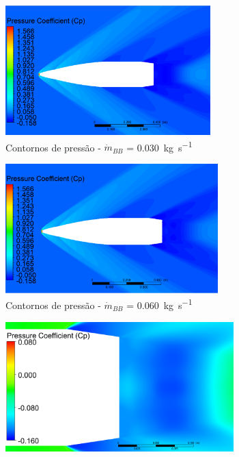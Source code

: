 \begin{figure}[!htpb]
	\centering
	\begin{subfigure}[b]{0.47\textwidth} %
        \centering
        \includegraphics[height=5cm,width=\textwidth]{contorno-pressao-2306-vazao-0030-2pol.png}
        \caption{Contornos de pressão - \(\Dot{m}_{BB}\) = \qty{0,030}{\kilogram\per\second}}
        \label{fig:contorno-pressao-bb-2pol-vazao0030}
    \end{subfigure}
    \hfill
    \begin{subfigure}[b]{0.47\textwidth} %
        \centering
        \includegraphics[height=5cm,width=\textwidth]{contorno-pressao-2306-vazao-0060-2pol.png}
        \caption{Contornos de pressão - \(\Dot{m}_{BB}\) = \qty{0,060}{\kilogram\per\second}}
        \label{fig:contorno-pressao-bb-2pol-vazao0060}
    \end{subfigure}
    \hfill
    \begin{subfigure}[b]{0.47\textwidth} %
        \centering
        \includegraphics[height=5cm,width=\textwidth]{coeficientepressao-vazao0030-temp2306-diam2pol.png}

\end{subfigure}
\end{figure}
